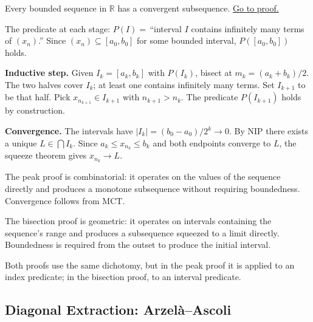 \begin{proposition}
\label{prop:bw-bisection}
Every bounded sequence in $\mathbb{R}$ has a convergent subsequence.
\hyperref[prf:bw-bisection]{Go to proof.}
\end{proposition}

\begin{remark*}
\end{remark*}


\begin{remark}
The predicate at each stage: $P(I)=\,$``interval $I$ contains infinitely
many terms of $(x_n)$.'' Since $(x_n)\subseteq[a_0,b_0]$ for some bounded
interval, $P([a_0,b_0])$ holds.

\medskip
\noindent\textbf{Inductive step.} Given $I_k=[a_k,b_k]$ with $P(I_k)$,
bisect at $m_k=(a_k+b_k)/2$. The two halves cover $I_k$; at least one
contains infinitely many terms. Set $I_{k+1}$ to be that half. Pick
$x_{n_{k+1}}\in I_{k+1}$ with $n_{k+1}>n_k$. The predicate $P(I_{k+1})$
holds by construction.

\medskip
\noindent\textbf{Convergence.} The intervals have $|I_k|=(b_0-a_0)/2^k\to 0$.
By NIP there exists a unique $L\in\bigcap I_k$. Since
$a_k\leq x_{n_k}\leq b_k$ and both endpoints converge to $L$, the squeeze
theorem gives $x_{n_k}\to L$.
\end{remark}

\begin{remark}
The peak proof is combinatorial: it operates on the values of the sequence
directly and produces a monotone subsequence without requiring boundedness.
Convergence follows from MCT.

The bisection proof is geometric: it operates on intervals containing the
sequence's range and produces a subsequence squeezed to a limit directly.
Boundedness is required from the outset to produce the initial interval.

Both proofs use the same dichotomy, but in the peak proof it is applied to
an index predicate; in the bisection proof, to an interval predicate.
\end{remark}

\subsection*{Diagonal Extraction: Arzel\`a--Ascoli}
\label{subsec:diagonal-extraction}

